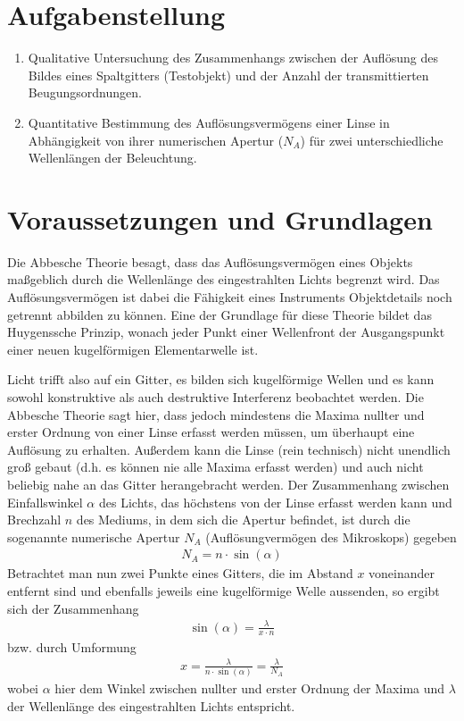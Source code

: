 \documentclass{article}
\begin{document}
\parindent0cm




\pagestyle{fancy}

\section{Aufgabenstellung}

\begin{enumerate}
\item Qualitative  Untersuchung des Zusammenhangs zwischen der  Auflösung  des  Bildes  eines Spaltgitters (Testobjekt) und der Anzahl der transmittierten Beugungsordnungen.
\item Quantitative Bestimmung  des Auflösungsvermögens  einer  Linse  in Abhängigkeit  von  ihrer numerischen Apertur ($N_A$) für zwei unterschiedliche Wellenlängen der Beleuchtung.
\end{enumerate}


\section{Voraussetzungen und Grundlagen}

Die Abbesche Theorie besagt, dass das Auflösungsvermögen eines Objekts maßgeblich durch die Wellenlänge des eingestrahlten Lichts begrenzt wird. Das Auflösungsvermögen ist dabei die Fähigkeit eines Instruments Objektdetails noch getrennt abbilden zu können. Eine der Grundlage für diese Theorie bildet das Huygenssche Prinzip, wonach jeder Punkt einer Wellenfront der Ausgangspunkt einer neuen kugelförmigen Elementarwelle ist.

Licht trifft also auf ein Gitter, es bilden sich kugelförmige Wellen und es kann sowohl konstruktive als auch destruktive Interferenz beobachtet werden. Die Abbesche Theorie sagt hier, dass jedoch mindestens die Maxima nullter und erster Ordnung von einer Linse erfasst werden müssen, um überhaupt eine Auflösung zu erhalten. Außerdem kann die Linse (rein technisch) nicht unendlich groß gebaut (d.h. es können nie alle Maxima erfasst werden) und auch nicht beliebig nahe an das Gitter herangebracht werden. Der Zusammenhang zwischen Einfallswinkel $\alpha$ des Lichts, das höchstens von der Linse erfasst werden kann und Brechzahl $n$ des Mediums, in dem sich die Apertur befindet, ist durch die sogenannte numerische Apertur $N_A$ (Auflösungvermögen des Mikroskops) gegeben
\begin{align}
N_A = n\cdot\sin(\alpha)
\end{align}
Betrachtet man nun zwei Punkte eines Gitters, die im Abstand $x$ voneinander entfernt sind und ebenfalls jeweils eine kugelförmige Welle aussenden, so ergibt sich der Zusammenhang
\begin{align}
\sin(\alpha) = \frac{\lambda}{x\cdot n}
\end{align}
bzw. durch Umformung
\begin{align}
x = \frac{\lambda}{n\cdot \sin(\alpha)} = \frac{\lambda}{N_A} 
\end{align}
wobei $\alpha$ hier dem Winkel zwischen nullter und erster Ordnung der Maxima und $\lambda$ der Wellenlänge des eingestrahlten Lichts entspricht.
\end{document}
